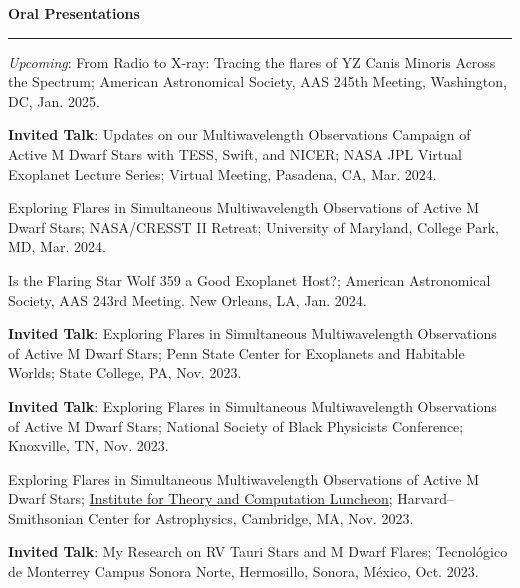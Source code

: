\documentclass[letter,12pt]{article}
\begin{document}
\newpage
\noindent
{\bf Oral Presentations} \\
\vspace{-10mm}
\begin{center}
\rule{\textwidth}{0.2mm}
\end{center}
\vspace{-3mm}
\noindent
\begin{etaremune}
\renewcommand\labelenumi{\bfseries\theenumi .}
\item \textit{Upcoming}: From Radio to X-ray: Tracing the flares of YZ Canis Minoris Across the Spectrum; American Astronomical Society, AAS 245th Meeting, Washington, DC, Jan. 2025.

\item \textbf{Invited Talk}: Updates on our Multiwavelength Observations Campaign of Active M Dwarf Stars with TESS, Swift, and NICER; NASA JPL Virtual Exoplanet Lecture Series; Virtual Meeting, Pasadena, CA, Mar. 2024. 

\item Exploring Flares in Simultaneous Multiwavelength Observations of Active M Dwarf Stars; NASA/CRESST II Retreat; University of Maryland, College Park, MD, Mar. 2024. 

\item Is the Flaring Star Wolf 359 a Good Exoplanet Host?; American Astronomical Society, AAS 243rd Meeting. New Orleans, LA, Jan. 2024.

\item \textbf{Invited Talk}: Exploring Flares in Simultaneous Multiwavelength Observations of Active M Dwarf Stars; Penn State Center for Exoplanets and Habitable Worlds; State College, PA, Nov. 2023.

\item \textbf{Invited Talk}: Exploring Flares in Simultaneous Multiwavelength Observations of Active M Dwarf Stars; National Society of Black Physicists Conference; Knoxville, TN, Nov. 2023.

\item Exploring Flares in Simultaneous Multiwavelength Observations of Active M Dwarf Stars; \href{https://itc.cfa.harvard.edu/event/itc-luncheon-112}{Institute for Theory and Computation Luncheon}; Harvard--Smithsonian Center for Astrophysics, Cambridge, MA, Nov. 2023.

\item \textbf{Invited Talk}: My Research on RV Tauri Stars and M Dwarf Flares; Tecnol\'{o}gico de Monterrey Campus Sonora Norte, Hermosillo, Sonora, M\'{e}xico, Oct. 2023.


\end{etaremune}
\end{document}
